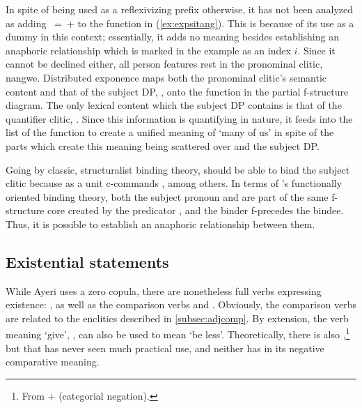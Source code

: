 In spite of  being used as a reflexivizing prefix
otherwise, it has not been analyzed as adding \ups{\Refl{}}~=~$+$ to the
\Subj{} function in (\ref{ex:expsitang}). This is because of its use as a dummy
in this context; essentially, it adds no meaning besides establishing an anaphoric
relationship which is marked in the example as an index $i$. Since it cannot be
declined either, all person features rest in the pronominal clitic, 
{nang}{we}. Distributed exponence maps both the pronominal clitic's semantic
content and that of the subject DP, , onto the
\Subj{} function in the partial f-structure diagram. The only lexical content
which the subject DP contains is that of the quantifier clitic,
. Since this information is quantifying in nature, it
feeds into the \Quant{} list of the \Subj{} function to create a unified
meaning of `many of us' in spite of the parts which create this meaning being
scattered over  and the subject DP.

Going by classic, structuralist binding theory,  should be
able to bind the subject clitic because  as a unit
c-commands , among others. In terms of \Lfg{}'s
functionally oriented binding theory, both the subject pronoun and
 are part of the same f-structure core created by
the predicator , and the binder f-precedes the
bindee. Thus, it is possible to establish an anaphoric relationship between
them.

\subsection{Existential statements}
\label{subsec:exs}

While Ayeri uses a zero copula, there are nonetheless full verbs expressing
existence: , as well as the
comparison verbs   and
. Obviously, the comparison verbs are related to the
enclitics described in \autoref{subsec:adjcomp}. By extension, the verb
meaning `give', , can also be used to mean `be less'.
Theoretically, there is also ,\footnote{From
 +  (categorial negation).} but that
has never seen much practical use, and neither has  in its
negative comparative meaning.

